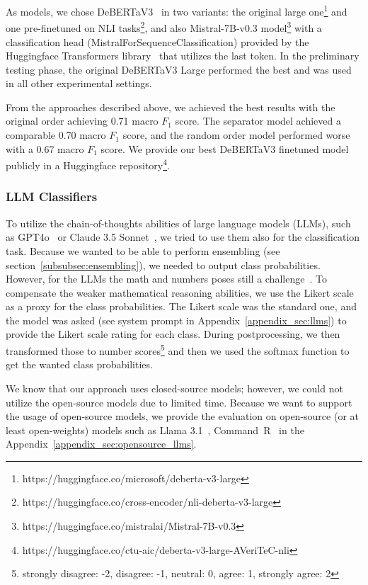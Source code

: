 As models, we chose DeBERTaV3~\cite{he2023debertav3improvingdebertausing} in two variants: the original large one\footnote{https://huggingface.co/microsoft/deberta-v3-large} and one pre-finetuned on NLI tasks\footnote{https://huggingface.co/cross-encoder/nli-deberta-v3-large}, and also Mistral-7B-v0.3 model\footnote{https://huggingface.co/mistralai/Mistral-7B-v0.3} with a classification head (MistralForSequenceClassification) provided by the Huggingface Transformers library~\cite{wolf-etal-2020-transformers} that utilizes the last token. In the preliminary testing phase, the original DeBERTaV3 Large performed the best and was used in all other experimental settings.

From the approaches described above, we achieved the best results with the original order achieving 0.71 macro $F_1$ score. The separator model achieved a comparable 0.70 macro $F_1$ score, and the random order model performed worse with a 0.67 macro $F_1$ score. We provide our best DeBERTaV3 finetuned model publicly in a Huggingface repository\footnote{https://huggingface.co/ctu-aic/deberta-v3-large-AVeriTeC-nli}.

\subsubsection*{LLM Classifiers}
To utilize the chain-of-thoughts abilities of large language models (LLMs), such as GPT4o~\cite{openai2024gpt4o} or Claude 3.5 Sonnet~\cite{anthropic2024claude35sonnet}, we tried to use them also for the classification task. Because we wanted to be able to perform ensembling (see section~\ref{subsubsec:ensembling}), we needed to output class probabilities. However, for the LLMs the math and numbers poses still a challenge~\cite{ahn-etal-2024-large}. To compensate the weaker mathematical reasoning abilities, we use the Likert scale as a proxy for the class probabilities. The Likert scale was the standard one, and the model was asked (see system prompt in Appendix~\ref{appendix_sec:llms}) to provide the Likert scale rating for each class. During postprocessing, we then transformed those to number scores\footnote{strongly disagree: -2, disagree: -1, neutral: 0, agree: 1, strongly agree: 2} and then we used the softmax function to get the wanted class probabilities.

We know that our approach uses closed-source models; however, we could not utilize the open-source models due to limited time. Because we want to support the usage of open-source models, we provide the evaluation on open-source (or at least open-weights) models such as Llama 3.1~\cite{meta2024llama31}, Command~R~\cite{cohere2024commandr} in the Appendix~\ref{appendix_sec:opensource_llms}.

